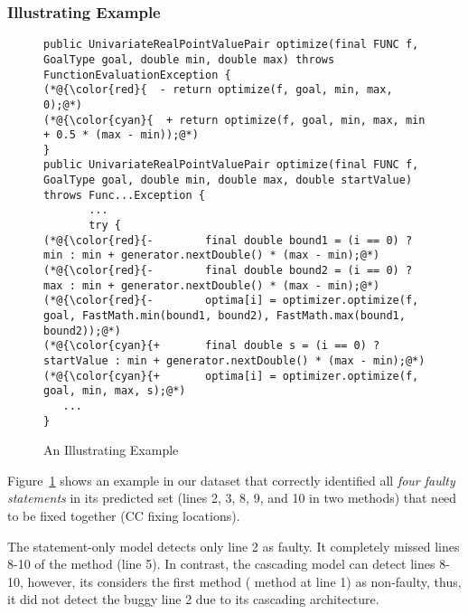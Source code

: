 \subsubsection{{\bf Illustrating Example}}
\label{sec:example}

\begin{figure}[t]
	\centering
	\begin{lstlisting}[]
public UnivariateRealPointValuePair optimize(final FUNC f, GoalType goal, double min, double max) throws FunctionEvaluationException {
(*@{\color{red}{  - return optimize(f, goal, min, max, 0);@*)
(*@{\color{cyan}{  + return optimize(f, goal, min, max, min + 0.5 * (max - min));@*)
}
public UnivariateRealPointValuePair optimize(final FUNC f, GoalType goal, double min, double max, double startValue) throws Func...Exception {
       ...
       try {
(*@{\color{red}{-        final double bound1 = (i == 0) ? min : min + generator.nextDouble() * (max - min);@*)
(*@{\color{red}{-        final double bound2 = (i == 0) ? max : min + generator.nextDouble() * (max - min);@*)
(*@{\color{red}{-        optima[i] = optimizer.optimize(f, goal, FastMath.min(bound1, bound2), FastMath.max(bound1, bound2));@*)
(*@{\color{cyan}{+       final double s = (i == 0) ? startValue : min + generator.nextDouble() * (max - min);@*)
(*@{\color{cyan}{+       optima[i] = optimizer.optimize(f, goal, min, max, s);@*)
   ...
}
\end{lstlisting}
        \vspace{-15pt}
	\caption{An Illustrating Example}
	\label{example}
\end{figure}

Figure~\ref{example} shows an example in our dataset that {\tool}
correctly identified all {\em four faulty statements} in its predicted
set (lines 2, 3, 8, 9, and 10 in two methods) that need to be fixed
together (CC fixing locations).

The statement-only model detects only line 2 as faulty. It completely
missed lines 8-10 of the  method (line 5). In contrast,
the cascading model can detect lines 8-10, however, its 
considers the first method ( method at line 1) as
non-faulty, thus, it did not detect the buggy line 2 due
to its cascading architecture.


